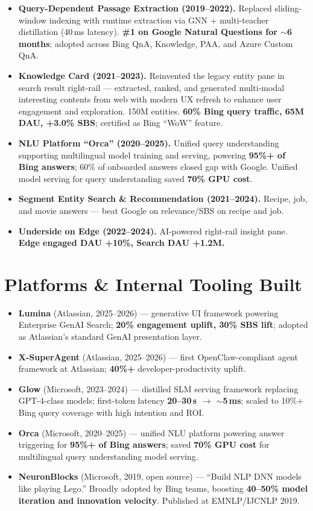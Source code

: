 \documentclass[10.5pt,letterpaper]{article}
\begin{document}
\begin{itemize}
  \item \textbf{Query-Dependent Passage Extraction (2019--2022).} Replaced sliding-window indexing with runtime extraction via GNN + multi-teacher distillation (40\,ms latency). \textbf{\#1 on Google Natural Questions for $\sim$6 months}; adopted across Bing QnA, Knowledge, PAA, and Azure Custom QnA.
  \item \textbf{Knowledge Card (2021--2023).} Reinvented the legacy entity pane in search result right-rail --- extracted, ranked, and generated multi-modal interesting contents from web with modern UX refresh to enhance user engagement and exploration. 150M entities. \textbf{60\% Bing query traffic, 65M DAU, +3.0\% SBS}; certified as Bing ``WoW'' feature.
  \item \textbf{NLU Platform ``Orca'' (2020--2025).} Unified query understanding supporting multilingual model training and serving, powering \textbf{95\%+ of Bing answers}; 60\% of onboarded answers closed gap with Google. Unified model serving for query understanding saved \textbf{70\% GPU cost}.
  \item \textbf{Segment Entity Search \& Recommendation (2021--2024).} Recipe, job, and movie answers --- beat Google on relevance/SBS on recipe and job.
  \item \textbf{Underside on Edge (2022--2024).} AI-powered right-rail insight pane. \textbf{Edge engaged DAU +10\%, Search DAU +1.2M.}
\end{itemize}

\section*{Platforms \& Internal Tooling Built}
\begin{itemize}
  \item \textbf{Lumina} (Atlassian, 2025--2026) --- generative UI framework powering Enterprise GenAI Search; \textbf{20\% engagement uplift, 30\% SBS lift}; adopted as Atlassian's standard GenAI presentation layer.
  \item \textbf{X-SuperAgent} (Atlassian, 2025--2026) --- first OpenClaw-compliant agent framework at Atlassian; \textbf{40\%+} developer-productivity uplift.
  \item \textbf{Glow} (Microsoft, 2023--2024) --- distilled SLM serving framework replacing GPT-4-class models; first-token latency \textbf{20--30\,s $\to$ $\sim$5\,ms}; scaled to 10\%+ Bing query coverage with high intention and ROI.
  \item \textbf{Orca} (Microsoft, 2020--2025) --- unified NLU platform powering answer triggering for \textbf{95\%+ of Bing answers}; saved \textbf{70\% GPU cost} for multilingual query understanding model serving.
  \item \textbf{NeuronBlocks} (Microsoft, 2019, open source) --- ``Build NLP DNN models like playing Lego.'' Broadly adopted by Bing teams, boosting \textbf{40--50\% model iteration and innovation velocity}. Published at EMNLP/IJCNLP 2019.
\end{itemize}
\end{document}
